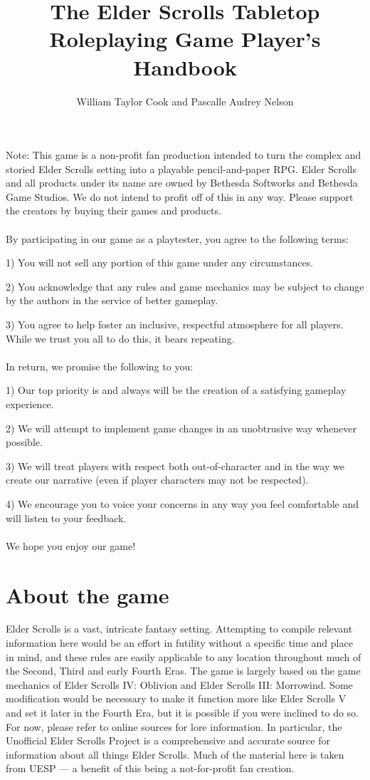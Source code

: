 \documentclass[12pt]{book}
\title{The Elder Scrolls Tabletop Roleplaying Game Player's Handbook}
\author{William Taylor Cook and Pascalle Audrey Nelson}
\begin{document}
\maketitle

Note: This game is a non-profit fan production intended to turn the complex and storied Elder Scrolls setting into a playable pencil-and-paper RPG. Elder Scrolls and all products under its name are owned by Bethesda Softworks and Bethesda Game Studios. We do not intend to profit off of this in any way. Please support the creators by buying their games and products.\\~\\
By participating in our game as a playtester, you agree to the following terms:

1)	You will not sell any portion of this game under any circumstances.

2)	You acknowledge that any rules and game mechanics may be subject to change by the authors in the service of better gameplay.

3)	You agree to help foster an inclusive, respectful atmosphere for all players. While we trust you all to do this, it bears repeating.\\~\\
In return, we promise the following to you:

1)	Our top priority is and always will be the creation of a satisfying gameplay experience.

2)	We will attempt to implement game changes in an unobtrusive way whenever possible.

3)	We will treat players with respect both out-of-character and in the way we create our narrative (even if player characters may not be respected).

4)	We encourage you to voice your concerns in any way you feel comfortable and will listen to your feedback.\\~\\
We hope you enjoy our game!
\newpage

\section*{About the game}

Elder Scrolls is a vast, intricate fantasy setting. Attempting to compile relevant information here would be an effort in futility without a specific time and place in mind, and these rules are easily applicable to any location throughout much of the Second, Third and early Fourth Eras. The game is largely based on the game mechanics of Elder Scrolls IV: Oblivion and Elder Scrolls III: Morrowind. Some modification would be necessary to make it function more like Elder Scrolls V and set it later in the Fourth Era, but it is possible if you were inclined to do so. For now, please refer to online sources for lore information. In particular, the Unofficial Elder Scrolls Project is a comprehensive and accurate source for information about all things Elder Scrolls. Much of the material here is taken from UESP --- a benefit of this being a not-for-profit fan creation.
\end{document}
